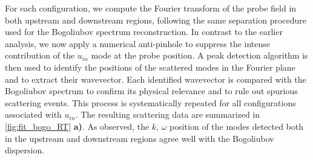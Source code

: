 For each configuration, we compute the Fourier transform of the probe field in both upstream and downstream regions, following the same separation procedure used for the Bogoliubov spectrum reconstruction. 
In contrast to the earlier analysis, we now apply a numerical anti-pinhole to suppress the intense contribution of the \( u_{in} \) mode at the probe position. A peak detection algorithm is then used to identify the positions of the scattered modes in the Fourier plane and to extract their wavevector.
Each identified wavevector is compared with the Bogoliubov spectrum to confirm its physical relevance and to rule out spurious scattering events. This process is systematically repeated for all configurations associated with \( u_{in} \). The resulting scattering data are summarized in \autoref{fig:fit_bogo_RT} \textbf{a)}. As observed, the $k,\,\omega$ position of the modes detected both in the upstream and downstream regions agree well with the Bogoliubov dispersion.

